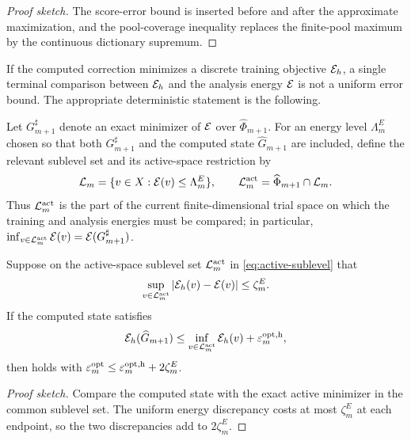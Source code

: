 \begin{proof}[Proof sketch]
The score-error bound is inserted before and after the approximate maximization, and the pool-coverage inequality replaces the finite-pool maximum by the continuous dictionary supremum.
\end{proof}

If the computed correction minimizes a discrete training objective $\mathcal{E}_h$, a single terminal comparison
between $\mathcal{E}_h$ and the analysis energy $\mathcal{E}$ is not a uniform error bound. The appropriate deterministic statement is
the following.

Let \(G_{m+1}^{\sharp}\) denote an exact minimizer of \(\mathcal{E}\) over
\(\widehat\Phi_{m+1}\). For an energy level \(\Lambda_m^E\) chosen so that both
\(G_{m+1}^{\sharp}\) and the computed state \(\widehat G_{m+1}\) are included, define the relevant sublevel
set and its active-space restriction by
\begin{equation}
 \mathcal L_m=\{v\in X:\mathcal{E}(v)\leq\Lambda_m^E\},
 \qquad \mathcal L_m^{\rm act}=\widehat\Phi_{m+1}\cap\mathcal L_m.
 \label{eq:active-sublevel}
\end{equation}
Thus \(\mathcal L_m^{\rm act}\) is the part of the current finite-dimensional trial space on which the
training and analysis energies must be compared; in particular,
\(\inf_{v\in\mathcal L_m^{\rm act}}\mathcal{E}(v)=\mathcal{E}(G_{m+1}^{\sharp})\).

\begin{lemma}
\label{lem:energy-transfer}
Suppose on the active-space sublevel set \(\mathcal L_m^{\rm act}\) in
\cref{eq:active-sublevel} that
\[
 \sup_{v\in\mathcal L_m^{\rm act}}
 \left\lvert \mathcal{E}_h(v)-\mathcal{E}(v)\right\rvert\leq\zeta_m^E.
\]
If the computed state satisfies
\[
 \mathcal{E}_h(\widehat G_{m+1})\leq
 \inf_{v\in\mathcal L_m^{\rm act}}\mathcal{E}_h(v)+\varepsilon_m^{\rm opt,h},
\]
then  holds with
\(\varepsilon_m^{\rm opt}\leq\varepsilon_m^{\rm opt,h}+2\zeta_m^E\).
\end{lemma}

\begin{proof}[Proof sketch]
Compare the computed state with the exact active minimizer in the common sublevel set.  The uniform energy discrepancy costs at most $\zeta_m^E$ at each endpoint, so the two discrepancies add to $2\zeta_m^E$.
\end{proof}
